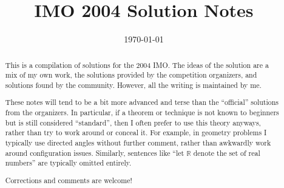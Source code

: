 \documentclass[11pt]{scrartcl}
\title{IMO 2004 Solution Notes}
\date{\today}
\begin{document}
\maketitle

\begin{abstract}
This is a compilation of solutions
for the 2004 IMO.
The ideas of the solution are a mix of my own work,
the solutions provided by the competition organizers,
and solutions found by the community.
However, all the writing is maintained by me.

These notes will tend to be a bit more advanced and terse than the ``official''
solutions from the organizers.
In particular, if a theorem or technique is not known to beginners
but is still considered ``standard'', then I often prefer to
use this theory anyways, rather than try to work around or conceal it.
For example, in geometry problems I typically use directed angles
without further comment, rather than awkwardly work around configuration issues.
Similarly, sentences like ``let $\mathbb{R}$ denote the set of real numbers''
are typically omitted entirely.

Corrections and comments are welcome!
\end{abstract}

\tableofcontents
\newpage

\addtocounter{section}{-1}
\end{document}
